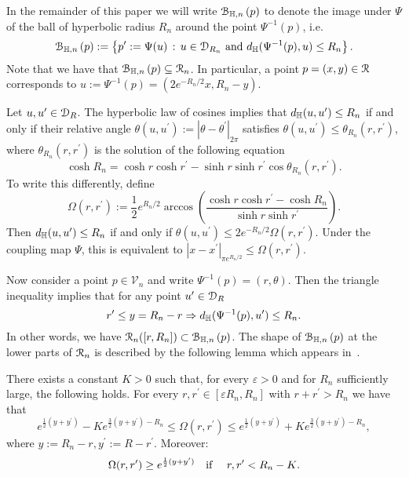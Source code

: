 In the remainder of this paper we will write ${\mathcal B}_{\mathbb{H},n}\left(p\right)$ to denote the image under $\Psi$ of the ball of hyperbolic radius $R_n$ around the point $\Psi^{-1}(p)$, i.e. 
\[
	{\mathcal B}_{\mathbb{H},n}\left(p\right) := \left\{p^\prime := \Psi(u) \, : \, u \in {\mathcal D}_{R_n} \text{ and } d_{\mathbb{H}}(\Psi^{-1}(p),u) \le R_n\right\}.
\]
Note that we have that ${\mathcal B}_{\mathbb{H},n}\left(p\right) \subseteq \mathcal{R}_n$. In particular, a point $p = (x,y) \in {\mathcal R}$ corresponds to $u := \Psi^{-1}(p) = (2 e^{-R_n/2} x, R_n - y)$. 

Let $u, u^\prime \in {\mathcal D}_R$. The hyperbolic law of cosines implies that $d_{\mathbb{H}}(u,u^\prime) \leq R_n$ if and only if their relative angle $\theta(u, u^\prime) := |\theta - \theta^\prime|_{2\pi}$ satisfies $\theta(u, u^\prime) \leq \theta_{R_n}(r,r^\prime)$, where $\theta_{R_n}(r,r^\prime)$ is the solution of the following equation
\[
	\cosh R_n =\cosh r \cosh r^\prime - \sinh r \sinh r^\prime \cos \theta_{R_n}(r,r^\prime).
\]
To write this differently, define
\begin{equation}\label{eq:def_Omega_hyperbolic}
	\Omega(r,r^\prime) := \frac{1}{2}e^{R_n/2} \arccos\left( \frac{\cosh r \cosh r^\prime - \cosh R_n}
	{\sinh r \sinh r^\prime} \right).
\end{equation}
Then $d_{\mathbb{H}}(u,u^\prime) \leq R_n$ if and only if $\theta(u, u^\prime) \leq 2 e^{-R_n/2}\Omega(r,r^\prime)$. Under the coupling map $\Psi$, this is equivalent to $|x-x^\prime|_{\pi e^{R_n/2}} \le \Omega(r,r^\prime)$.

Now consider a point $p \in \mathcal{V}_n$ and write $\Psi^{-1}(p) = (r,\theta)$. Then the triangle inequality implies that
for any point $u^\prime \in {\mathcal D}_R$
\begin{equation}\label{eq:tail_inclusion_hyperbolic_ball}
	r^\prime \leq y = R_n - r \Rightarrow d_{\mathbb{H}} (\Psi^{-1}(p),u^\prime) \leq R_n.
\end{equation}
In other words, we have ${\mathcal R}_n ([r, R_n])  \subset {\mathcal B}_{\mathbb{H},n}\left(p\right)$. The shape of ${\mathcal B}_{\mathbb{H},n}\left(p\right)$ at the lower parts of ${\mathcal R}_n$ is described by the following lemma which appears in~\cite{fountoulakis2018law}. 


\begin{lemma}\label{lem:asymptotics_Omega_hyperbolic}
There exists a constant $K>0$ such that, for every $\varepsilon > 0$ and for $R_n$ sufficiently large, the following holds.
For every $r,r^\prime \in [\varepsilon R_n,R_n]$ with $r + r^\prime > R_n$ we have that 
\begin{equation}\label{eq:asymp1}
	e^{\frac{1}{2}(y+y^\prime)} - K e^{\frac{3}{2}(y+y^\prime) - R_n} \leq \Omega(r, r^\prime) 
	\leq  e^{\frac{1}{2}(y+y^\prime)} + K e^{\frac{3}{2}(y+y^\prime) - R_n},
\end{equation}
where $y := R_n - r, y^\prime := R - r^\prime$. 
Moreover:
\begin{equation}\label{eq:asymp2} 
\Omega(r,r^\prime) \geq e^{\frac12(y+y^\prime)} \quad \text{if \quad $r, r^\prime < R_n - K$.} 
\end{equation}
\end{lemma}

